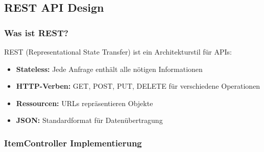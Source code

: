 \documentclass[a4paper,12pt]{article}
\begin{document}
\subsection{REST API Design}

\subsubsection{Was ist REST?}

REST (Representational State Transfer) ist ein Architekturstil für APIs:
\begin{itemize}
    \item \textbf{Stateless:} Jede Anfrage enthält alle nötigen Informationen
    \item \textbf{HTTP-Verben:} GET, POST, PUT, DELETE für verschiedene Operationen
    \item \textbf{Ressourcen:} URLs repräsentieren Objekte
    \item \textbf{JSON:} Standardformat für Datenübertragung
\end{itemize}

\subsubsection{ItemController Implementierung}
\end{document}
